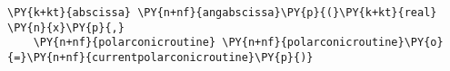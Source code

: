 \begin{Verbatim}[commandchars=\\\{\}]
    \PY{k+kt}{abscissa} \PY{n+nf}{angabscissa}\PY{p}{(}\PY{k+kt}{real} \PY{n}{x}\PY{p}{,}
    \PY{n+nf}{polarconicroutine} \PY{n+nf}{polarconicroutine}\PY{o}{=}\PY{n+nf}{currentpolarconicroutine}\PY{p}{)}
\end{Verbatim}
